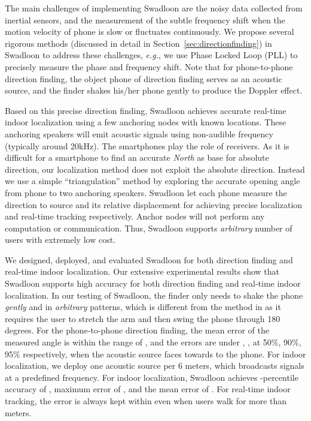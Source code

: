 \documentclass[]{sig-alternate-10pt}
\def\eg{\textit{e.g.}\xspace}
\def \ourprotocol{Swadloon\xspace}
\begin{document}
The main challenges of implementing \ourprotocol are the
 noisy data collected from inertial sensors, and the
 measurement of the subtle frequency shift when the motion velocity of
 phone is slow or fluctuates continuously.
We propose several rigorous methods (discussed in detail in
 Section~\ref{sec:directionfinding}) in \ourprotocol to address these
 challenges, \eg, we use Phase Locked Loop (PLL) to
 precisely measure the phase and frequency shift.
Note that for phone-to-phone direction finding,
 the object phone of direction finding serves as an acoustic source,
 and the finder shakes his/her phone gently to produce the Doppler effect.

Based on this precise  direction finding, \ourprotocol achieves
 accurate real-time indoor localization using a few anchoring
 nodes  with known locations.
These anchoring speakers will emit acoustic signals using non-audible
 frequency (typically around 20kHz).
The smartphones play the role of receivers.
As it is difficult for a smartphone to find an accurate \emph{North}
 as base for absolute direction, our localization method does not 
 exploit the  absolute direction.
Instead we use a simple ``triangulation'' method by exploring the
 accurate opening angle from phone to two anchoring speakers.
 \ourprotocol let each phone measure the direction to source and its relative displacement for achieving  precise localization and  real-time tracking respectively. Anchor nodes will not perform any computation or communication.  Thus, \ourprotocol  supports
 \emph{arbitrary} number of users with extremely low cost.


We designed, deployed, and evaluated \ourprotocol for both direction
 finding and  real-time indoor localization.
Our extensive experimental results show that
 \ourprotocol  supports high accuracy for both direction finding and
 real-time indoor  localization.
In our testing of \ourprotocol, the finder only needs to shake the phone
 \emph{gently} and in \emph{arbitrary} patterns, which is  different
 from  the method in 
 \cite{2012-MobiQuitous2011-ProposalDirectionEstimation} as it requires
 the user to stretch the arm and then swing the phone through 180 degrees.
 For the phone-to-phone direction finding, the mean error of
 the measured angle is  within the range of , and the
 errors are under , ,   at  50\%, 90\%, 95\%
 respectively, when  the acoustic source faces towards to the phone. 
For indoor localization, we deploy one acoustic source  per 6 meters,
 which broadcasts signals at a predefined frequency.
For indoor localization, \ourprotocol  achieves -percentile
 accuracy of , maximum error of , and the mean error of
 .
For real-time indoor tracking, the error is always kept within 
 even when users walk for  more than  meters.
\end{document}
